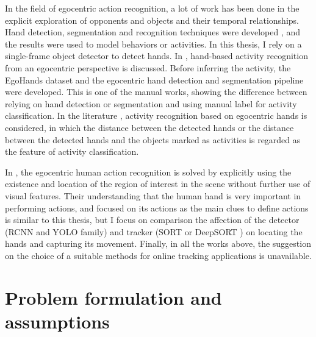 In the field of egocentric action recognition, a lot of work has been done in the explicit exploration of opponents and objects and their temporal relationships. Hand detection, segmentation and recognition techniques were developed \cite{6619302} \cite{6910041} \cite{10.1016/j.cviu.2016.09.005}, and the results were used to model behaviors or activities. In this thesis, I rely on a single-frame object detector to detect hands. In \cite{7410583}, hand-based activity recognition from an egocentric perspective is discussed. Before inferring the activity, the EgoHands dataset and the egocentric hand detection and segmentation pipeline were developed. This is one of the manual works, showing the difference between relying on hand detection or segmentation and using manual label for activity classification. In the literature \cite{Recognition}, activity recognition based on egocentric hands is considered, in which the distance between the detected hands or the distance between the detected hands and the objects marked as activities is regarded as the feature of activity classification.

In \cite{9060114}, the egocentric human action recognition is solved by explicitly using the existence and location of the region of interest in the scene without further use of visual features. Their understanding that the human hand is very important in performing actions, and focused on its actions as the main clues to define actions is similar to this thesis, but I focus on comparison the affection of the detector (RCNN and YOLO family) and tracker (SORT \cite{DBLP:journals/corr/BewleyGORU16} or DeepSORT \cite{DBLP:journals/corr/WojkeBP17} ) on locating the hands and capturing its movement. Finally, in all the works above, the suggestion on the choice of a suitable methods for online tracking applications is unavailable.
\section{Problem formulation and assumptions}
